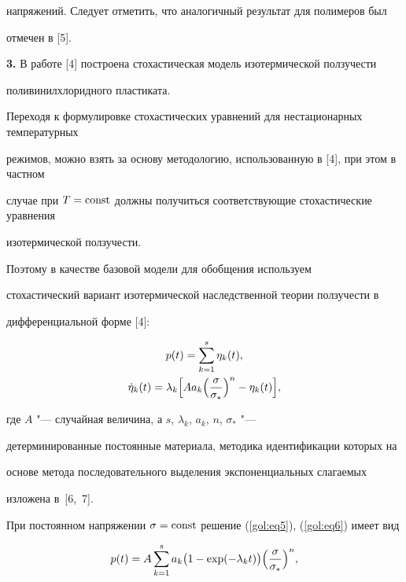 напряжений. Следует отметить, что аналогичный результат для полимеров был

отмечен в [5].



\textbf{3.} В работе [4] построена стохастическая модель изотермической ползучести

поливинилхлоридного пластиката.

Переходя к формулировке стохастических уравнений для нестационарных температурных

режимов, можно взять за основу методологию, использованную в [4], при этом в частном

случае при $T= \rm const$ должны получиться соответствующие стохастические уравнения

изотермической ползучести.

Поэтому в качестве базовой модели для обобщения используем

стохастический вариант изотермической наследственной теории ползучести в

дифференциальной форме [4]:

\begin{gather}

\label{gol:eq5}

p(t)=\sum\limits_{k=1}^s \eta _k (t) ,

\\

\label{gol:eq6}

\dot \eta _k (t)=\lambda _k

\Bigl[ A a_k \Bigl( \frac{\sigma }{\sigma _\ast } \Bigr)^n-\eta _k (t)

\Bigr],

\end{gather}

где $A$ "--- случайная величина, а $s$, $\lambda _k$, $a_k$, $n$, $\sigma _\ast $ "---

детерминированные постоянные материала, методика идентификации которых на

основе метода последовательного выделения экспоненциальных слагаемых

изложена в~[6,~7].



При постоянном напряжении $\sigma = \rm const$ решение (\ref{gol:eq5}), (\ref{gol:eq6}) имеет вид

\begin{equation}

\label{gol:eq7}

p(t)=A\sum\limits_{k=1}^s

a_k \bigl( 1-\exp (-\lambda _k t )  \bigr) \Bigl( \frac{\sigma }{\sigma _\ast }  \Bigr)^n  ,

\end{equation}

